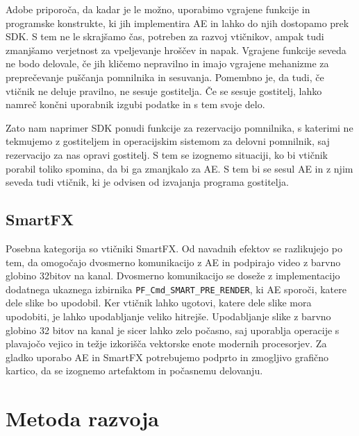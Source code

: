 \documentclass[a4paper, 12pt]{book}
\begin{document}

Adobe priporoča, da kadar je le možno, uporabimo vgrajene funkcije in programske konstrukte, ki jih implementira AE in lahko do njih dostopamo prek SDK. 
S tem ne le skrajšamo čas, potreben za razvoj vtičnikov, ampak tudi zmanjšamo verjetnost za vpeljevanje hroščev in napak. 
Vgrajene funkcije seveda ne bodo delovale, če jih kličemo nepravilno in imajo vgrajene mehanizme za preprečevanje puščanja pomnilnika in sesuvanja. 
Pomembno je, da tudi, če vtičnik ne deluje pravilno, ne sesuje gostitelja. 
Če se sesuje gostitelj, lahko namreč končni uporabnik izgubi podatke in s tem svoje delo. 

Zato nam naprimer SDK ponudi funkcije za rezervacijo pomnilnika, s katerimi ne tekmujemo z gostiteljem in operacijskim sistemom za delovni pomnilnik, saj rezervacijo za nas opravi gostitelj.
S tem se izognemo situaciji, ko bi vtičnik porabil toliko spomina, da bi ga zmanjkalo za AE. 
S tem bi se sesul AE in z njim seveda tudi vtičnik, ki je odvisen od izvajanja programa gostitelja.


\subsection{SmartFX} %

Posebna kategorija so vtičniki SmartFX. 
Od navadnih efektov se razlikujejo po tem, da omogočajo dvosmerno komunikacijo z AE in podpirajo video z barvno globino 32bitov na kanal\cite{aesdk}. 
Dvosmerno komunikacijo se doseže z  implementacijo dodatnega ukaznega izbirnika {\tt PF\_Cmd\_SMART\_PRE\_RENDER}, ki AE sporoči, katere dele slike bo upodobil. 
Ker vtičnik lahko ugotovi, katere dele slike mora upodobiti, je lahko upodabljanje veliko hitrejše.
Upodabljanje slike z barvno globino 32 bitov na kanal je sicer lahko zelo počasno, saj uporablja operacije s plavajočo vejico in težje izkorišča vektorske enote modernih procesorjev.
Za gladko uporabo AE in SmartFX potrebujemo podprto in zmogljivo grafično kartico, da se izognemo artefaktom in počasnemu delovanju\cite{preproccclassroom}.


\section{Metoda razvoja}
\end{document}
